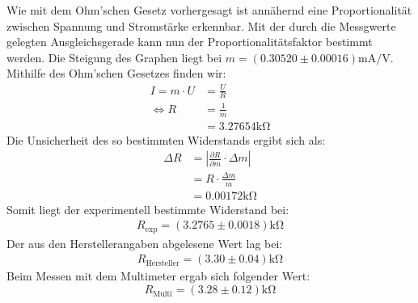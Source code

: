 \documentclass{report}
\begin{document}
\noindent
Wie mit dem Ohm'schen Gesetz vorhergesagt ist annähernd eine Proportionalität zwischen Spannung und Stromstärke erkennbar. Mit der durch die Messgwerte gelegten 
Ausgleichsgerade kann nun der Proportionalitätsfaktor bestimmt werden. 
Die Steigung des Graphen liegt bei $m = (0.30520 \pm 0.00016) \si{\milli \ampere \per \volt}$.
Mithilfe des Ohm'schen Gesetzes finden wir:
\begin{equation}
    \begin{split}
        I = m \cdot U &= \frac{U}{R} \\
        \Leftrightarrow R   &= \frac{1}{m} \\
                            &= 3.27654 \si{\kilo \ohm}
    \end{split}
\end{equation}
Die Unsicherheit des so bestimmten Widerstands ergibt sich als:
\begin{equation}
    \begin{split}
        \Delta R    &= \left\lvert\frac{\partial R}{\partial m} \cdot \Delta m \right\rvert \\
                    &= R \cdot \frac{\Delta m}{m} \\
                    &= 0.00172 \si{\kilo \ohm}
    \end{split}
\end{equation}
Somit liegt der experimentell bestimmte Widerstand bei:
\begin{equation}
    \begin{split}
        R_{\mathrm{exp}} = (3.2765 \pm 0.0018) \si{\kilo \ohm}
    \end{split}
\end{equation}
Der aus den Herstellerangaben abgelesene Wert lag bei:
\begin{equation}
    \begin{split}
        R_{\mathrm{Hersteller}} = (3.30 \pm 0.04) \si{\kilo \ohm}
    \end{split}
\end{equation}
Beim Messen mit dem Multimeter ergab sich folgender Wert:
\begin{equation}
    R_{\mathrm{Multi}} = (3.28 \pm 0.12) \si{\kilo \ohm}
\end{equation}
\end{document}
